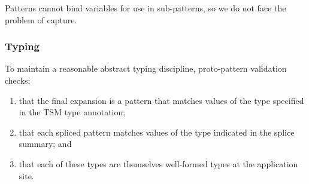 \documentclass[acmlarge,review,anonymous]{acmart}\settopmatter{printfolios=true}
\begin{document}
Patterns cannot bind variables for use in sub-patterns, so we do not face the problem of capture. %

\subsubsection{Typing} To maintain a reasonable abstract typing discipline, proto-pattern validation checks:
\begin{enumerate}
  \item that the final expansion is a pattern that matches values of the type specified in the TSM type annotation;
  \item that each spliced pattern matches values of the type indicated in the splice summary; and 
  \item that each of these types are themselves well-formed types at the application site.
\end{enumerate}
\newcommand{\seTSMsFormallySec}{Simple TSMs, Formally}
\end{document}
